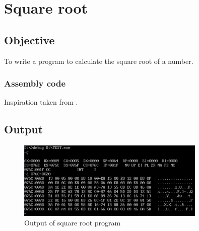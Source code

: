 \section{Square root}

\subsection{Objective}

To write a program to calculate the square root of a number.

\subsubsection{Assembly code}



Inspiration taken from \cite{sqrt}.

\subsection{Output}

\begin{figure}[ht]
    \centering
    \includegraphics[width=0.8\textwidth]{./res/practicals/sqrt.png}
    \caption{Output of square root program}
    \label{fig:sqrt}
\end{figure}

\pagebreak
